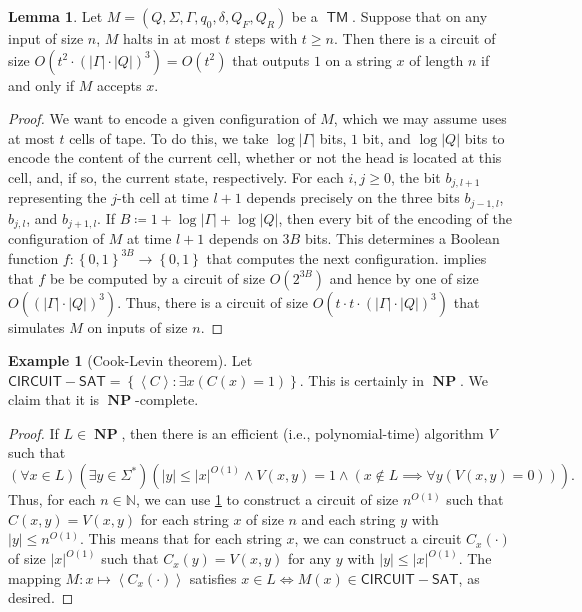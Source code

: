 \documentclass[10pt,letterpaper,cm]{nupset}
\theoremstyle{definition}
\newtheorem{exmp}[definition]{Example}
\theoremstyle{theorem}
\newtheorem{lemma}[definition]{Lemma}
\theoremstyle{remark}
\newcommand{\N}{\mathbb N}
\newcommand{\1}{\mathbf{1}}
\newcommand{\0}{\vec 0}
\DeclareMathOperator{\TM}{\mathsf{TM}}
\DeclareMathOperator{\NP}{\mathbf{NP}}
\begin{document}
\begin{lemma}\label{pl2}
Let $M= \left(Q, \Sigma, \Gamma, q_0, \delta, Q_F, Q_R\right)$ be a $\TM$. Suppose that on any input of size $n$, $M$ halts in at most $t$ steps with $t\geq n$. Then there is a circuit of size $O\left(t^2 \cdot (\left\lvert{\Gamma}\right\rvert\cdot \left\lvert{Q}\right\rvert)^3\right) = O\left(t^2\right)$ that  outputs $1$ on a  string $x$ of length $n$ if and only if $M$ accepts $x$.
\end{lemma}
\begin{proof}
We want to encode a given configuration of $M$, which we may assume uses at most $t$ cells of tape. To do this, we take $\log{\left\lvert{\Gamma}\right\rvert}$ bits, $1$ bit, and $\log{\left\lvert{Q}\right\rvert}$ bits to encode the content of the current cell, whether or not the head is located at this cell, and, if so, the current state, respectively.  For each $i,j\geq0$, the bit $b_{j, l+1}$ representing the $j$-th cell at time $l+1$ depends precisely on the three bits $b_{j-1, l}$, $b_{j, l}$, and $b_{j+1, l}$. If $B\coloneqq 1+ \log{\left\lvert{\Gamma}\right\rvert} +\log{\left\lvert{Q}\right\rvert}$, then every bit of the encoding of the configuration of $M$ at time $l+1$ depends on $3B$ bits. This determines a Boolean function $f: \left\{0,1\right\}^{3B}\to \left\{0,1\right\}$ that computes the next configuration.  implies that $f$ be be computed by a circuit of size $O\left(2^{3B}\right)$ and hence by one of size $O\left(\left(\left\lvert{\Gamma}\right\rvert\cdot \left\lvert{Q}\right\rvert\right)^3\right)$. Thus, there is a circuit of size $O\left(t\cdot t\cdot  \left(\left\lvert{\Gamma}\right\rvert \cdot \left\lvert{Q}\right\rvert\right)^3\right)$ that simulates $M$ on inputs of size $n$.
\end{proof}

\begin{exmp}[Cook-Levin theorem]
Let  $\mathsf{CIRCUIT{-}SAT} = \left\{ \left\langle C \right\rangle : \exists x\left(C(x) = 1\right)\right\}$. This is certainly in $\NP$. We claim that it is $\NP$-complete.
\end{exmp}
\begin{proof}
If $L \in \NP$, then there is an efficient (i.e.,  polynomial-time) algorithm $V$ such that $$\left(\forall x\in L\right)\left(\exists y\in \Sigma^{\ast}\right)\left(\left\lvert{y}\right\rvert\leq \left\lvert{x}\right\rvert^{O(1)} \land V\left(x,y\right) =1 \land \left(x\notin L \implies \forall y\left(V\left(x,y\right)=0\right)\right)\right).$$ Thus, for each $n\in \N$, we can use \cref{pl2} to construct a circuit of size $n^{O(1)}$ such that $C\left(x,y\right) = V\left(x,y\right)$ for each string $x$ of size $n$ and each string $y$ with $\left\lvert{y}\right\rvert\leq n^{O(1)}$. This means that for each string $x$, we can construct a circuit $C_x({\cdot})$ of size $\left\lvert{x}\right\rvert^{O(1)}$ such that $C_x(y) = V\left(x,y\right)$ for any $y$ with $\left\lvert{y}\right\rvert\leq \left\lvert{x}\right\rvert^{O(1)}$. The mapping $M: x\mapsto \left\langle C_x({\cdot}) \right\rangle$ satisfies $x\in L \iff M(x) \in \mathsf{CIRCUIT{-}SAT}$, as desired.  
\end{proof}
\end{document}
